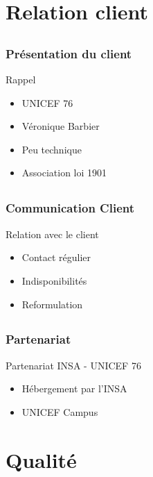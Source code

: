 \documentclass[compress,xcolor=dvipsnames]{beamer}
\begin{document}
\section{Relation client}
\subsection{}
\begin{frame}
\frametitle{Présentation du client}
\begin{block}{Rappel}
\begin{itemize}
	\item UNICEF 76
	\item Véronique Barbier
	\item Peu technique
	\item Association loi 1901
\end{itemize}
\end{block}
\end{frame}


\subsection{}
\begin{frame}
\frametitle{Communication Client}
\begin{block}{Relation avec le client}
\begin{itemize}
	\item Contact régulier
	\item Indisponibilités
	\item Reformulation
\end{itemize}
\end{block}
\end{frame}


\subsection{}
\begin{frame}
\frametitle{Partenariat}
\begin{block}{Partenariat INSA - UNICEF 76}
\begin{itemize}
	\item Hébergement par l'INSA
	\item UNICEF Campus
\end{itemize}
\end{block}
\end{frame}



\section{Qualité}
\end{document}
